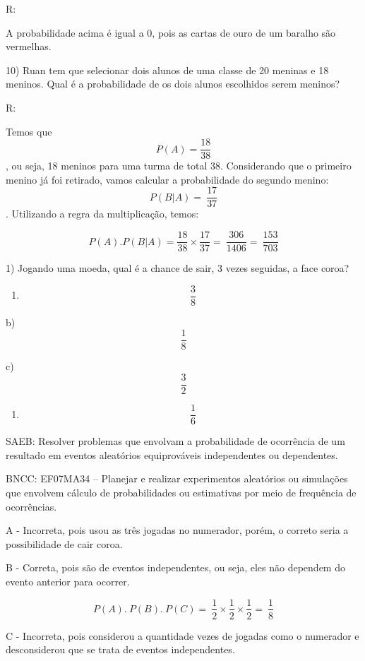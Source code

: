 R:

A probabilidade acima é igual a 0, pois as cartas de ouro de um baralho
são vermelhas.

10) Ruan tem que selecionar dois alunos de uma classe de 20 meninas e 18
meninos. Qual é a probabilidade de os dois alunos escolhidos serem
meninos?

R:

Temos que \[P(A) = \frac{18}{38}\], ou seja, 18 meninos para uma turma
de total 38. Considerando que o primeiro menino já foi retirado, vamos
calcular a probabilidade do segundo menino:
\[P(B|A) = \ \frac{17}{37}\]. Utilizando a regra da multiplicação,
temos:

\[P(A).P(B|A) = \frac{18}{38} \times \frac{17}{37} = \ \frac{306}{1406} = \ \frac{153}{703}\]


1) Jogando uma moeda, qual é a chance de sair, 3 vezes seguidas, a face
coroa?

\begin{enumerate}
\def\labelenumi{\alph{enumi})}
\tightlist
\item
  \[\ \frac{3}{8}\]
\end{enumerate}

b) \[\frac{1}{8}\]

c) \[\frac{3}{2}\]

\begin{enumerate}
\def\labelenumi{\alph{enumi})}
\setcounter{enumi}{3}
\tightlist
\item
  \[\ \frac{1}{6}\]
\end{enumerate}

SAEB: Resolver problemas que envolvam a probabilidade de ocorrência de
um resultado em eventos aleatórios equiprováveis independentes ou
dependentes.

BNCC: EF07MA34 -- Planejar e realizar experimentos aleatórios ou
simulações que envolvem cálculo de probabilidades ou estimativas por
meio de frequência de ocorrências.

A - Incorreta, pois usou as três jogadas no numerador, porém, o correto
seria a possibilidade de cair coroa.

B - Correta, pois são de eventos independentes, ou seja, eles não
dependem do evento anterior para ocorrer.

\[P(A).\ P(B).\ P(C) = \ \frac{1}{2} \times \frac{1}{2} \times \frac{1}{2} = \ \frac{1}{8}\]

C - Incorreta, pois considerou a quantidade vezes de jogadas como o
numerador e desconsiderou que se trata de eventos independentes.

